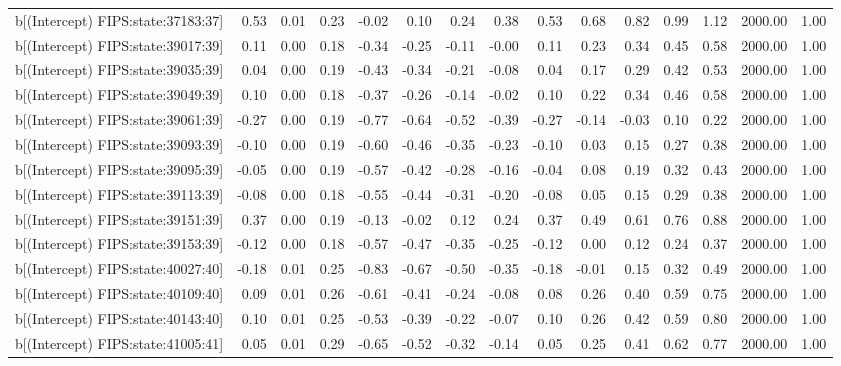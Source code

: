 \begin{table}[ht]
\begin{tabular}{rrrrrrrrrrrrrrr}
  b[(Intercept) FIPS:state:37183:37] & 0.53 & 0.01 & 0.23 & -0.02 & 0.10 & 0.24 & 0.38 & 0.53 & 0.68 & 0.82 & 0.99 & 1.12 & 2000.00 & 1.00 \\ 
  b[(Intercept) FIPS:state:39017:39] & 0.11 & 0.00 & 0.18 & -0.34 & -0.25 & -0.11 & -0.00 & 0.11 & 0.23 & 0.34 & 0.45 & 0.58 & 2000.00 & 1.00 \\ 
  b[(Intercept) FIPS:state:39035:39] & 0.04 & 0.00 & 0.19 & -0.43 & -0.34 & -0.21 & -0.08 & 0.04 & 0.17 & 0.29 & 0.42 & 0.53 & 2000.00 & 1.00 \\ 
  b[(Intercept) FIPS:state:39049:39] & 0.10 & 0.00 & 0.18 & -0.37 & -0.26 & -0.14 & -0.02 & 0.10 & 0.22 & 0.34 & 0.46 & 0.58 & 2000.00 & 1.00 \\ 
  b[(Intercept) FIPS:state:39061:39] & -0.27 & 0.00 & 0.19 & -0.77 & -0.64 & -0.52 & -0.39 & -0.27 & -0.14 & -0.03 & 0.10 & 0.22 & 2000.00 & 1.00 \\ 
  b[(Intercept) FIPS:state:39093:39] & -0.10 & 0.00 & 0.19 & -0.60 & -0.46 & -0.35 & -0.23 & -0.10 & 0.03 & 0.15 & 0.27 & 0.38 & 2000.00 & 1.00 \\ 
  b[(Intercept) FIPS:state:39095:39] & -0.05 & 0.00 & 0.19 & -0.57 & -0.42 & -0.28 & -0.16 & -0.04 & 0.08 & 0.19 & 0.32 & 0.43 & 2000.00 & 1.00 \\ 
  b[(Intercept) FIPS:state:39113:39] & -0.08 & 0.00 & 0.18 & -0.55 & -0.44 & -0.31 & -0.20 & -0.08 & 0.05 & 0.15 & 0.29 & 0.38 & 2000.00 & 1.00 \\ 
  b[(Intercept) FIPS:state:39151:39] & 0.37 & 0.00 & 0.19 & -0.13 & -0.02 & 0.12 & 0.24 & 0.37 & 0.49 & 0.61 & 0.76 & 0.88 & 2000.00 & 1.00 \\ 
  b[(Intercept) FIPS:state:39153:39] & -0.12 & 0.00 & 0.18 & -0.57 & -0.47 & -0.35 & -0.25 & -0.12 & 0.00 & 0.12 & 0.24 & 0.37 & 2000.00 & 1.00 \\ 
  b[(Intercept) FIPS:state:40027:40] & -0.18 & 0.01 & 0.25 & -0.83 & -0.67 & -0.50 & -0.35 & -0.18 & -0.01 & 0.15 & 0.32 & 0.49 & 2000.00 & 1.00 \\ 
  b[(Intercept) FIPS:state:40109:40] & 0.09 & 0.01 & 0.26 & -0.61 & -0.41 & -0.24 & -0.08 & 0.08 & 0.26 & 0.40 & 0.59 & 0.75 & 2000.00 & 1.00 \\ 
  b[(Intercept) FIPS:state:40143:40] & 0.10 & 0.01 & 0.25 & -0.53 & -0.39 & -0.22 & -0.07 & 0.10 & 0.26 & 0.42 & 0.59 & 0.80 & 2000.00 & 1.00 \\ 
  b[(Intercept) FIPS:state:41005:41] & 0.05 & 0.01 & 0.29 & -0.65 & -0.52 & -0.32 & -0.14 & 0.05 & 0.25 & 0.41 & 0.62 & 0.77 & 2000.00 & 1.00 \\ 

\end{tabular}
\end{table}
